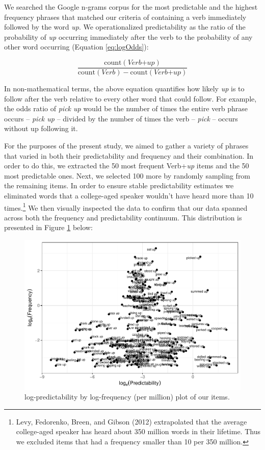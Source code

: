 \documentclass[
  man,floatsintext]{apa6}
\begin{document}
We searched the Google n-grams corpus for the most predictable and the highest frequency phrases that matched our criteria of containing a verb immediately followed by the word \emph{up}. We operationalized predictability as the ratio of the probability of \emph{up} occurring immediately after the verb to the probability of any other word occurring (Equation \eqref{eq:logOdds}):

\begin{equation}
\label{eq:logOdds}
\frac{\mathrm{count(\textit{Verb+up})}}{\mathrm{count(\textit{Verb})} - \mathrm{count(\textit{Verb+up})}} 
\end{equation}

In non-mathematical terms, the above equation quantifies how likely \emph{up} is to follow after the verb relative to every other word that could follow. For example, the odds ratio of \emph{pick up} would be the number of times the entire verb phrase occurs -- \emph{pick up} -- divided by the number of times the verb -- \emph{pick} -- occurs without up following it.

For the purposes of the present study, we aimed to gather a variety of phrases that varied in both their predictability and frequency and their combination. In order to do this, we extracted the 50 most frequent Verb+\emph{up} items and the 50 most predictable ones. Next, we selected 100 more by randomly sampling from the remaining items. In order to ensure stable predictability estimates we eliminated words that a college-aged speaker wouldn't have heard more than 10 times.\footnote{Levy, Fedorenko, Breen, and Gibson (2012) extrapolated that the average college-aged speaker has heard about 350 million words in their lifetime. Thus we excluded items that had a frequency smaller than 10 per 350 million.} We then visually inspected the data to confirm that our data spanned across both the frequency and predictability continuum. This distribution is presented in Figure \ref{fig:stimplot2} below:

\begin{figure}

{\centering \includegraphics[width=0.8\linewidth]{write-up_files/figure-latex/stimplot2-1} 

}

\caption{log-predictability by log-frequency (per million) plot of our items.}\label{fig:stimplot2}
\end{figure}
\end{document}
